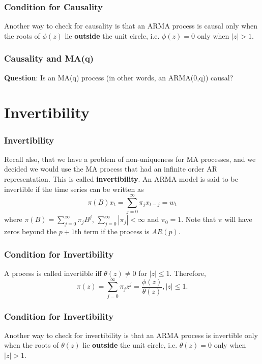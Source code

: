 \documentclass[%
xcolor=pdftex]{beamer}
\begin{document}
\begin{frame}
\frametitle{Condition for Causality}

Another way to check for causality is that an ARMA process is causal only when the roots of $\phi(z)$ lie \textbf{outside} the unit circle, i.e. $\phi(z)=0$ only when $|z| > 1$.

\end{frame}

\begin{frame}
\frametitle{Causality and MA(q)}

\textbf{Question}: Is an MA(q) process (in other words, an ARMA(0,q)) causal?

\vspace{40mm}

\end{frame}

\section{Invertibility}
\frame{\tableofcontents[currentsection]}

\begin{frame}
\frametitle{Invertibility}

Recall also, that we have a problem of non-uniqueness for MA processes, and we decided we would use the MA process that had an infinite order AR representation.  This is called {\bf invertibility}. An ARMA model is said to be invertible if the time series can be written as
\begin{equation} \label{eq:invert}
\pi(B) x_t = \sum_{j=0}^\infty \pi_j x_{t-j}=w_t
\end{equation}
where $\pi(B) = \sum_{j=0}^\infty \pi_j  B^j $, $ \sum_{j=0}^\infty |\pi_j| < \infty$ and $\pi_0=1$. Note that $\pi$ will have zeros beyond the $p+1$th term if the process is $AR(p)$.

\end{frame}

\begin{frame}
\frametitle{Condition for Invertibility}

A process is called invertible iff $\theta(z) \neq 0$ for $|z|\leq1$.  Therefore,
\begin{equation} \label{eq:invert_rep}
\pi(z)=\sum_{j=0}^\infty \pi_j z^j=\frac{\phi(z)}{\theta(z)},  |z|\leq 1.
\end{equation}

\end{frame}

\begin{frame}
\frametitle{Condition for Invertibility}

Another way to check for invertibility is that an ARMA process is invertible only when the roots of $\theta(z)$ lie \textbf{outside} the unit circle, i.e. $\theta(z)=0$ only when $|z| > 1$.

\end{frame}
\end{document}
